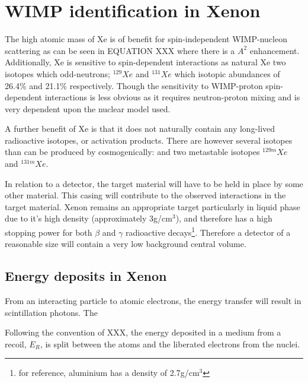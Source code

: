 \section{WIMP identification in Xenon}
\label{sec:wimps_with_xenon}

\par
The high atomic mass of Xe is of benefit for spin-independent WIMP-nucleon scattering as can be seen in EQUATION XXX where there is a $A^2$ enhancement.
Additionally, Xe is sensitive to spin-dependent interactions as natural Xe two isotopes which odd-neutrons; ${}^{129}Xe$ and ${}^{131}Xe$ which isotopic abundances of 26.4\% and 21.1\% respectively.
Though the sensitivity to WIMP-proton spin-dependent interactions is less obvious as it requires neutron-proton mixing and is very dependent upon the nuclear model used.

\par
A further benefit of Xe is that it does not naturally contain any long-lived radioactive isotopes, or activation products.
There are however several isotopes than can be produced by cosmogenically: and two metastable isotopes ${}^{129m}Xe$ and ${}^{131m}Xe$.


\par
In relation to a detector, the target material will have to be held in place by some other material.
This casing will contribute to the observed interactions in the target material.
Xenon remains an appropriate target particularly in liquid phase due to it's high density (approximately 3g/cm${}^{3}$), and therefore has a high stopping power for both $\beta$ and $\gamma$ radioactive decays\footnote{for reference, aluminium has a density of 2.7g/cm${}^{3}$}.
Therefore a detector of a reasonable size will contain a very low background central volume.


\subsection{Energy deposits in Xenon}
\par
From an interacting particle to atomic electrons, the energy transfer will result in scintillation photons.
The 



Following the convention of XXX, the energy deposited in a medium from a recoil, $E_R$, is split between the atoms and the liberated electrons from the nuclei. 

